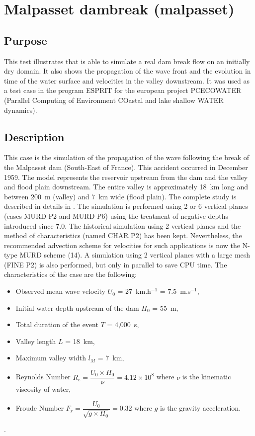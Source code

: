 \chapter{Malpasset dambreak (malpasset)}

\section{Purpose}

This test illustrates that  is able to simulate a real dam break flow on an initially dry domain. It also shows the propagation of the wave front and the evolution in time of the water surface and velocities in the valley downstream. It was used as a test case in the program ESPRIT for the european project PCECOWATER (Parallel Computing of Environment COastal and lake shallow WATER dynamics).

\section{Description}

This case is the simulation of the propagation of the wave following the break of the Malpasset dam
(South-East of France). This accident occurred in December 1959.
The model represents the reservoir upstream from the dam and the valley and flood plain downstream.
The entire valley is approximately 18~km long and between 200~m (valley) and 7~km wide (flood plain).
The complete study is described in details in \cite{Hervouet2007}.
The simulation is performed using 2 or 6 vertical planes (cases MURD P2 and MURD P6)
using the treatment of negative depths introduced since  7.0.
The historical simulation using 2 vertical planes and the method of characteristics (named CHAR P2)
has been kept. Nevertheless, the recommended advection scheme for velocities for such applications
is now the N-type MURD scheme (14). A simulation using 2 vertical planes with a large mesh
(FINE P2) is also performed, but only in parallel to save CPU time.
The characteristics of the case are the following:
\begin{itemize}
  \itemsep0em
\item Observed mean wave velocity $U_0$ = 27~km.h$^{-1}$ = 7.5~m.s$^{-1}$,
\item Initial water depth upstream of the dam $H_0$ = 55~m,
\item Total duration of the event $T$ = 4,000~s,
\item Valley length $L$ = 18~km,
\item Maximum valley width $l_M$ = 7~km,
\item Reynolds Number \textbf{$R_e = \dfrac{U_0 \times H_0}{\nu} =  4.12 \times 10^8$} where $\nu$ is the kinematic viscosity of water,
\item Froude Number \textbf{$F_r = \dfrac{U_0}{\sqrt{g \times H_0}} = 0.32$} where $g$ is the gravity acceleration.
\end{itemize}.


